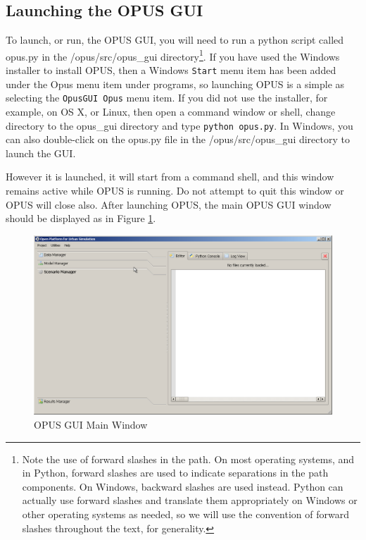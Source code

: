 \subsection{Launching the OPUS GUI}
To launch, or run, the OPUS GUI, you will need to run a python script called opus.py in the /opus/src/opus\_gui directory\footnote{Note the use of forward slashes in the path.  On most operating systems, and in Python, forward slashes are used to indicate separations in the path components.  On Windows, backward slashes are used instead.  Python can actually use forward slashes and translate them appropriately on Windows or other operating systems as needed, so we will use the convention of forward slashes throughout the text, for generality.}.  If you have used the Windows installer to install OPUS, then a Windows \verb#Start# menu item has been added under the Opus menu item under programs, so launching OPUS is a simple as selecting the \verb#OpusGUI Opus# menu item.  If you did not use the installer, for example, on OS X, or Linux, then open a command window or shell, change directory to the opus\_gui directory and type \verb#python opus.py#.  In Windows, you can also double-click on the opus.py file in the /opus/src/opus\_gui directory to launch the GUI.

However it is launched, it will start from a command shell, and this window remains active while OPUS is running.  Do not attempt to quit this window or OPUS will close also.  After launching OPUS, the main OPUS GUI window should be displayed as in Figure \ref{fig:opus1}.

\begin{figure}[htp]
\begin{center}
\includegraphics[scale=0.4]{graphics/opus1.png}
\end{center}
\caption{OPUS GUI Main Window}
\label{fig:opus1}
\end{figure}

